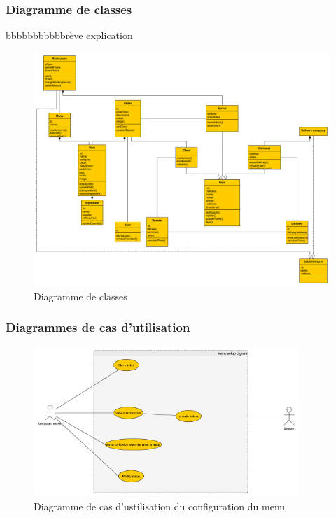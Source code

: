 \documentclass[french, a4paper, french]{report}
\begin{document}
		
		\subsubsection{Diagramme de classes}
			bbbbbbbbbbbrève explication
			\newpage
			\begin{figure}[!h]
  				\center
  				\includegraphics[width=15cm]{classdiag.png}
  				\caption{Diagramme de classes}
  				\label{fig:classdiag}
			\end{figure}
		
		\subsubsection{Diagrammes de cas d’utilisation}
			\newpage
			\begin{figure}[!h]
  				\center
  				\includegraphics[width=10cm]{usecasemenu.png}
  				\caption{Diagramme de cas d'ustilisation du configuration du menu}
  				\label{fig:usecasemenu}
			\end{figure}
			
\end{document}
